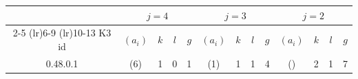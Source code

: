 {\small\centering\setlength{\tabcolsep}{3pt}
\begin{longtable}{ccccccccccccc}
 & \multicolumn{4}{c}{$j = 4$} & \multicolumn{4}{c}{$j = 3$} & \multicolumn{4}{c}{$j = 2$}\\
\cmidrule(lr){2-5}
\cmidrule(lr){6-9}
\cmidrule(lr){10-13}
K3 id & $(a_i)$ & $k$ & $l$ & $g$ & $(a_i)$ & $k$ & $l$ & $g$ & $(a_i)$ & $k$ & $l$ & $g$\\
\hline
\endhead
\rowcolor{lightgray}
0.48.0.1 & (6) & 1 & 0 & 1 & (1) & 1 & 1 & 4 & () & 2 & 1 & 7\\
\hline\end{longtable}
}
